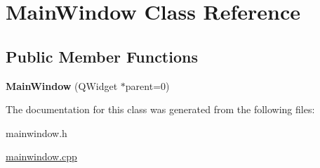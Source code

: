 \hypertarget{classMainWindow}{
\section{MainWindow Class Reference}
\label{classMainWindow}
}
\subsection*{Public Member Functions}
\begin{DoxyCompactItemize}
\item 
\hypertarget{classMainWindow_a8b244be8b7b7db1b08de2a2acb9409db}{
{\bfseries MainWindow} (QWidget $\ast$parent=0)}
\label{classMainWindow_a8b244be8b7b7db1b08de2a2acb9409db}

\end{DoxyCompactItemize}


The documentation for this class was generated from the following files:\begin{DoxyCompactItemize}
\item 
mainwindow.h\item 
\hyperlink{mainwindow_8cpp}{mainwindow.cpp}\end{DoxyCompactItemize}
